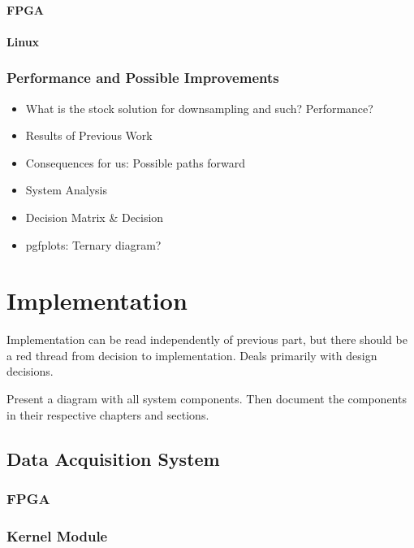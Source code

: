\documentclass[a4paper,oneside]{alpenthesis/alpenthesis}
\begin{document}
\subsection{FPGA}
\subsection{Linux}

\section{Performance and Possible Improvements}
\begin{itemize}
    \item
    What is the stock solution for downsampling and such? Performance?
    \item
    Results of Previous Work
    \item
    Consequences for us: Possible paths forward
    \item
    System Analysis
    \item 
    Decision Matrix \& Decision
    \item
    pgfplots: Ternary diagram?
\end{itemize}



\part{Implementation} %
\label{part:Implementation}
Implementation can be read independently of previous part, but there should be
a  red thread  from decision  to implementation. Deals  primarily with  design
decisions.

Present a diagram with all  system components. Then document the components in
their respective chapters and sections.

\chapter{Data Acquisition System}
\label{ch:data_acquisition_system}
\section{FPGA}
\section{Kernel Module}
\end{document}

